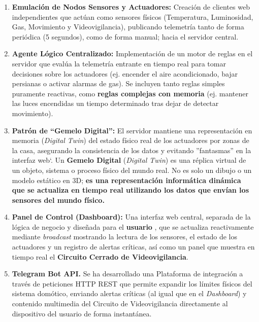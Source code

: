 \documentclass[a4paper,12pt]{article}
\begin{document}
			\begin{enumerate}
				\item \textbf{Emulación de Nodos Sensores y Actuadores:} Creación de clientes web independientes que actúan como sensores físicos (Temperatura, Luminosidad, Gas, Movimiento y Videovigilancia), publicando telemetría tanto de forma periódica (5 segundos), como de forma manual; hacia el servidor central.
				
				\item \textbf{Agente Lógico Centralizado:} Implementación de un motor de reglas en el servidor que evalúa la telemetría entrante en tiempo real para tomar decisiones sobre los actuadores (ej. encender el aire acondicionado, bajar persianas o activar alarmas de gas). Se incluyen tanto reglas simples puramente reactivas, como \textbf{reglas complejas con memoria} (ej. mantener las luces encendidas un tiempo determinado tras dejar de detectar movimiento).
				
				\item \textbf{Patrón de ``Gemelo Digital'':} El servidor mantiene una representación en memoria (\textit{Digital Twin}) del estado físico real de los actuadores por zonas de la casa, asegurando la consistencia de los datos y evitando ''fantasmas'' en la interfaz web`. Un \textbf{Gemelo Digital} (\textit{Digital Twin}) es una réplica virtual de un objeto, sistema o proceso físico del mundo real. No es solo un dibujo o un modelo estático en 3D; \textbf{es una representación informática dinámica que se actualiza en tiempo real utilizando los datos que envían los sensores del mundo físico.}
				
				\item \textbf{Panel de Control (Dashboard):} Una interfaz web central, separada de la lógica de negocio y diseñada para el \textbf{usuario} , que se actualiza reactivamente mediante \textit{broadcast} mostrando la lectura de los sensores, el estado de los actuadores y un registro de alertas críticas, así como un panel que muestra en tiempo real el \textbf{Circuito Cerrado de Videovigilancia}.
				
				\item \textbf{Telegram Bot API.} Se ha desarrollado una Plataforma de integración a través de peticiones HTTP REST que permite expandir los límites físicos del sistema domótico, enviando alertas críticas (al igual que en el \textit{Dashboard}) y contenido multimedia del Circuito de Videovigilancia directamente al dispositivo del usuario de forma instantánea.
			\end{enumerate}
			
\end{document}
